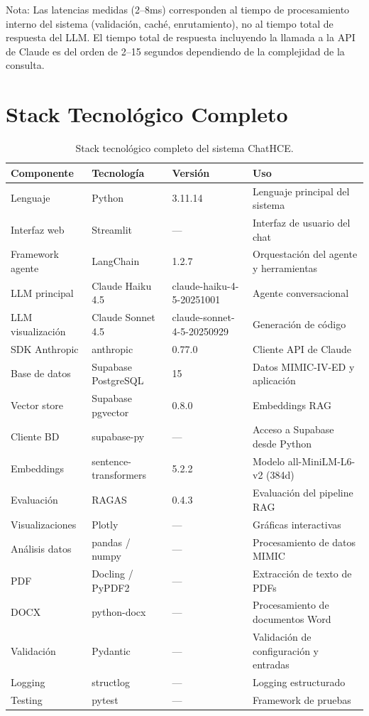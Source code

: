 ﻿\documentclass[11pt,a4paper]{article}
\begin{document}
Nota: Las latencias medidas (2--8ms) corresponden al tiempo de procesamiento interno del sistema (validaci\'on, cach\'e, enrutamiento), no al tiempo total de respuesta del LLM. El tiempo total de respuesta incluyendo la llamada a la API de Claude es del orden de 2--15 segundos dependiendo de la complejidad de la consulta.

\section{Stack Tecnol\'ogico Completo}

\begin{table}[H]
\centering
\caption{Stack tecnol\'ogico completo del sistema ChatHCE.}
\label{tab:stack}
\begin{tabularx}{\textwidth}{lllX}
\toprule
\textbf{Componente} & \textbf{Tecnolog\'ia} & \textbf{Versi\'on} & \textbf{Uso} \\
\midrule
Lenguaje & Python & 3.11.14 & Lenguaje principal del sistema \\
Interfaz web & Streamlit & --- & Interfaz de usuario del chat \\
Framework agente & LangChain & 1.2.7 & Orquestaci\'on del agente y herramientas \\
LLM principal & Claude Haiku 4.5 & claude-haiku-4-5-20251001 & Agente conversacional \\
LLM visualizaci\'on & Claude Sonnet 4.5 & claude-sonnet-4-5-20250929 & Generaci\'on de c\'odigo \\
SDK Anthropic & anthropic & 0.77.0 & Cliente API de Claude \\
Base de datos & Supabase PostgreSQL & 15 & Datos MIMIC-IV-ED y aplicaci\'on \\
Vector store & Supabase pgvector & 0.8.0 & Embeddings RAG \\
Cliente BD & supabase-py & --- & Acceso a Supabase desde Python \\
Embeddings & sentence-transformers & 5.2.2 & Modelo all-MiniLM-L6-v2 (384d) \\
Evaluaci\'on & RAGAS & 0.4.3 & Evaluaci\'on del pipeline RAG \\
Visualizaciones & Plotly & --- & Gr\'aficas interactivas \\
An\'alisis datos & pandas / numpy & --- & Procesamiento de datos MIMIC \\
PDF & Docling / PyPDF2 & --- & Extracci\'on de texto de PDFs \\
DOCX & python-docx & --- & Procesamiento de documentos Word \\
Validaci\'on & Pydantic & --- & Validaci\'on de configuraci\'on y entradas \\
Logging & structlog & --- & Logging estructurado \\
Testing & pytest & --- & Framework de pruebas \\
\bottomrule
\end{tabularx}
\end{table}
\end{document}

